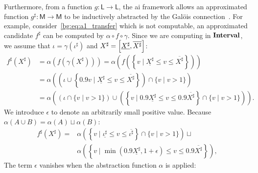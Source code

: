 Furthermore, from a function $g: \mathsf{L} \to \mathsf{L}$, the
\gls{ai} framework allows an approximated function $g^\sharp:
\mathsf{M} \to \mathsf{M}$ to be inductively abstracted by the Gal\"ois
connection~\cite{nielson99}.  For example, consider~\eqref{bg:eq:a1_transfer}
which is not computable, an approximated candidate $f^\sharp$ can be
computed by $\alpha \circ f \circ \gamma$.  Since we are computing in
$\mathbf{Interval}$, we assume that $\iota = \gamma(\iota^\sharp)$ and $X^\sharp =
\left[{\underline{X^\sharp}}, {\overline{X^\sharp}}\right]$:
\begin{equation}
    \begin{aligned}
        f^\sharp(X^\sharp)
        &= \alpha \left( f \left(
            \gamma \left( X^\sharp \right)
        \right) \right)
        = \alpha \left( f \left( \left\{
            v \mid \underline{X^\sharp} \leq v \leq \overline{X^\sharp}
        \right\} \right) \right) \\
        &= \alpha \left(
        \left(
            \iota \cup
            \left\{
                0.9 v \mid
                \underline{X^\sharp} \leq v \leq \overline{X^\sharp}
            \right\}
        \right) \cap \{ v \mid v > 1 \} \right) \\
        &= \alpha \left(
            \left( \iota \cap \{ v \mid v > 1 \} \right) \cup
            \left( \left\{
                v \mid
                0.9 \underline{X^\sharp} \leq v \leq 0.9 \overline{X^\sharp}
            \right\} \cap \{ v \mid v > 1 \} \right)
        \right).
    \end{aligned}
\end{equation}
We introduce $\epsilon$ to denote an arbitrarily small positive value.  Because
$\alpha(A \cup B) = \alpha(A) \sqcup \alpha(B)$:
\begin{equation}
    \begin{aligned}
        f^\sharp(X^\sharp)
        ={} & \alpha \left( \left\{
            v \mid \underline{\iota^\sharp}
                \leq v \leq \overline{\iota^\sharp}
        \right\} \cap \{ v \mid v > 1 \} \right) \sqcup \\
        &
        \alpha \left( \left\{
            v \mid
            \min(0.9 \underline{X^\sharp}, 1 + \epsilon)
                \leq v \leq 0.9 \overline{X^\sharp}
        \right\} \right),
    \end{aligned}
\end{equation}
The term $\epsilon$ vanishes when the abstraction function $\alpha$ is applied:
